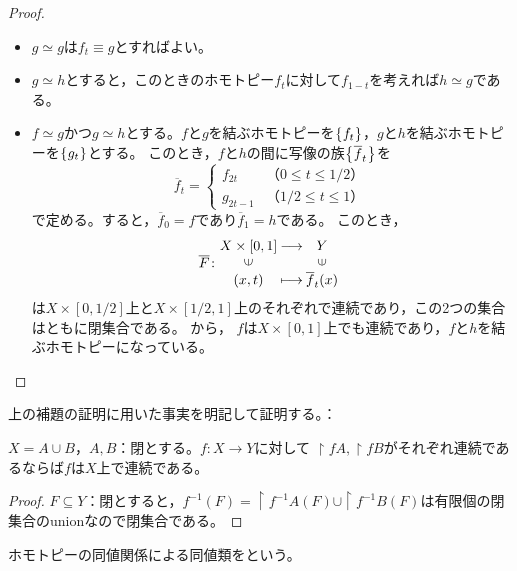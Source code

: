 \documentclass[uplatex]{jsarticle}
\begin{document}
\begin{proof}
  \begin{itemize}
    \vspace{-0.5\baselineskip}
    \item $g \simeq g$は$f_{t} \equiv g$とすればよい。
    \item $g \simeq h$とすると，このときのホモトピー$f_{t}$に対して$f_{1-t}$を考えれば$h \simeq g$である。
    \item $f \simeq g$かつ$g \simeq h$とする。$f$と$g$を結ぶホモトピーを$\Set{\hspace{-1.8pt} f_{t} \hspace{-1.8pt}}$，$g$と$h$を結ぶホモトピーを$\Set{\hspace{-1.8pt} g_{t} \hspace{-1.8pt}}$とする。
    このとき，$f$と$h$の間に写像の族$\Set{\hspace{-1.8pt} \overline{f}_{t} \hspace{-1.8pt}}$を
    \begin{equation}
      \overline{f}_{t} = \begin{cases}
        f_{2t} & （0 \le t \le 1/2） \\
        g_{2t-1} & （1/2 \le t \le 1）
      \end{cases}
    \end{equation}
    で定める。すると，$\overline{f}_{0} = f$であり$\overline{f}_{1} = h$である。
    このとき，
    \begin{equation}
      \overline{F} \colon \mapdef{X \times [0,1]}{Y}{(x,t)}{\overline{f}_{t}(x)}
    \end{equation}
    は$X \times [0,1/2]$上と$X \times [1/2,1]$上のそれぞれで連続であり，この2つの集合はともに閉集合である。
    から， $f$は$X \times [0,1]$上でも連続であり，$f$と$h$を結ぶホモトピーになっている。
  \end{itemize}
\end{proof}

上の補題の証明に用いた事実を明記して証明する。：

\begin{hodai}
  \label{close.continuous}
  $X = A \cup B$，$A,B$：閉とする。$f \colon X \longrightarrow Y$に対して
  $\restriction{f}{A},\restriction{f}{B}$がそれぞれ連続であるならば$f$は$X$上で連続である。
\end{hodai}

\begin{proof}
  $F \subseteq Y$：閉とすると，$f^{-1} (F) = \restriction{f^{-1}}{A}(F) \cup \restriction{f^{-1}}{B}(F)$は有限個の閉集合のunionなので閉集合である。
\end{proof}

\begin{teigi}[ホモトピー類]
  ホモトピーの同値関係による同値類をという。
\end{teigi}
\end{document}
